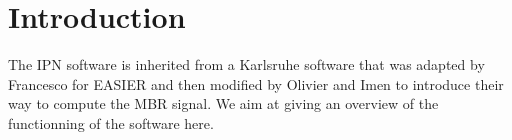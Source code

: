 \section{Introduction}
The  IPN software  is inherited  from  a Karlsruhe  software that  was
adapted by Francesco for EASIER  and then modified by Olivier and Imen
to introduce their way to compute  the MBR signal. We aim at giving an
overview of the functionning of the software here. \\ 

